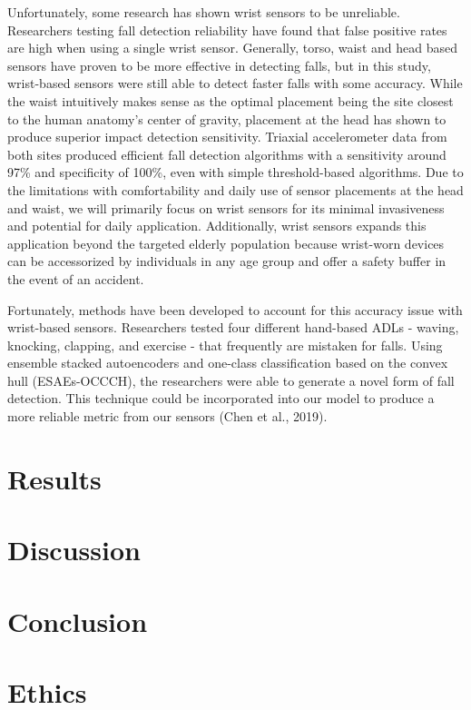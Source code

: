 \documentclass{llncs}
\begin{document}
	Unfortunately, some research has shown wrist sensors to be unreliable. Researchers testing fall detection reliability have found that false positive rates are high when using a single wrist sensor.\cite{gjoreski2016accurately} Generally, torso, waist and head based sensors have proven to be more effective in detecting falls, but in this study, wrist-based sensors were still able to detect faster falls with some accuracy. While the waist intuitively makes sense as the optimal placement being the site closest to the human anatomy's center of gravity, placement at the head has shown to produce superior impact detection sensitivity. Triaxial accelerometer data from both sites produced efficient fall detection algorithms with a sensitivity around 97\% and specificity of 100\%, even with simple threshold-based algorithms.\cite{kangas2008comparison} Due to the limitations with comfortability and daily use of sensor placements at the head and waist, we will primarily focus on wrist sensors for its minimal invasiveness and potential for daily application. Additionally, wrist sensors expands this application beyond the targeted elderly population because wrist-worn devices can be accessorized by individuals in any age group and offer a safety buffer in the event of an accident.
	
	Fortunately, methods have been developed to account for this accuracy issue with wrist-based sensors. Researchers tested four different hand-based ADLs - waving, knocking, clapping, and exercise - that frequently are mistaken for falls. Using ensemble stacked autoencoders and one-class classification based on the convex hull (ESAEs-OCCCH), the researchers were able to generate a novel form of fall detection. This technique could be incorporated into our model to produce a more reliable metric from our sensors (Chen et al., 2019). \cite{chen2019method}
	
	


\section{Results}
\section{Discussion}
\section{Conclusion}

\section{Ethics}
\end{document}
